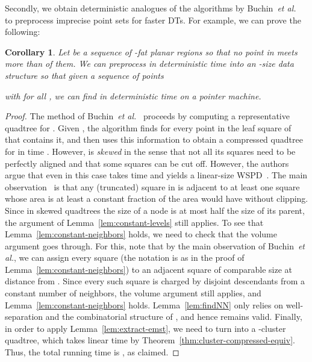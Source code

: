 \documentclass[11pt]{paper}
\newcommand {\etal} {\textit {et al.}}
\newtheorem {cor}[theorem] {Corollary}
\begin{document}
  Secondly, we obtain deterministic analogues of the algorithms by
  Buchin~\etal~\cite {BuchinLoMoMuXX} to preprocess imprecise point sets
  for faster DTs. For example, we can prove the following:
  \begin {cor}\label{cor:IDT}
    Let  be
    a sequence of 
     -fat
    planar regions so that 
    no point in  
    meets more than  of them. 
    We can preprocess  in 
    deterministic time into an -size data structure
    so that given a sequence of   points 
     
    with  for all , we can find 
    in deterministic time  on a pointer
    machine.
  \end {cor}

\begin{proof}
    The method of
    Buchin~\etal~\cite[Theorem~4.3 and Corollary~5.6]{BuchinLoMoMuXX}
    proceeds by computing a
    representative quadtree  for .
    Given , the algorithm finds for every point in 
    the leaf square of  that contains it, and then uses this
    information to obtain a compressed quadtree  for  in time
    . However,  is \emph{skewed}
    in the sense that not all its squares need to be perfectly
    aligned and that some squares can be cut off.
    However, the authors argue
    that even in this case  takes  time and
    yields a linear-size WSPD~\cite[Appendix~B]{BuchinLoMoMuXX}.
    The main observation~\cite[Observation~B.1]{BuchinLoMoMuXX}
    is that any (truncated) square  in  is adjacent to at least
    one square whose area is at least a constant fraction of the
    area  would have without clipping.
    Since in skewed quadtrees the size of a node is at most half
    the size of its parent, the argument of Lemma~\ref{lem:constant-levels}
    still applies.
    To see that Lemma~\ref{lem:constant-neighbors} holds,
    we need to check that the volume argument goes through.
    For this, note that by the main observation of Buchin~\etal, we
    can assign every square  (the notation is as in the proof of
    Lemma~\ref{lem:constant-neighbors}) to an adjacent square of
    comparable size at distance  from . Since every such
    square is charged by disjoint descendants from a constant number of
    neighbors, the volume argument still applies, and
    Lemma~\ref{lem:constant-neighbors} holds. Lemma~\ref{lem:findNN}
    only relies on well-separation and the combinatorial structure of
    , and hence remains valid.
    Finally, in order to apply Lemma~\ref{lem:extract-emst},
    we need to turn  into a -cluster quadtree,
    which takes linear time by Theorem~\ref{thm:cluster-compressed-equiv}.
    Thus, the total running time is , as claimed.
\end{proof}
\end{document}
